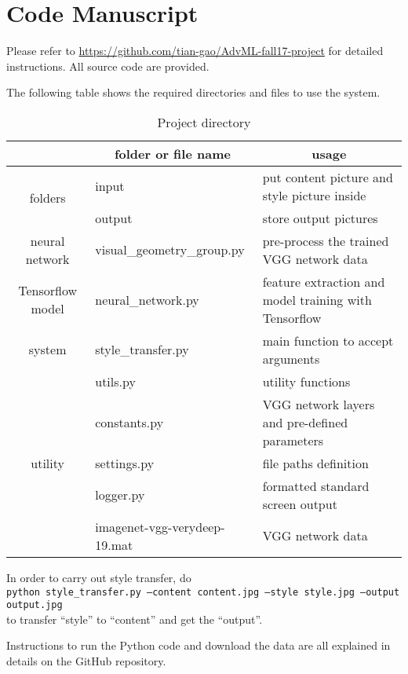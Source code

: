 \chapter{Code Manuscript}
\label{app:readme}


Please refer to \url{https://github.com/tian-gao/AdvML-fall17-project} for detailed instructions.
All source code are provided.

The following table shows the required directories and files to use the system.

	\begin{table}[!htb]
	\center
	\begin{tabular}{c|l|l}
	\hline
	& \multicolumn{1}{c|}{folder or file name} & \multicolumn{1}{c}{usage} \\ \hline
	\multirow{2}{*}{folders}
		& input & put content picture and style picture inside \\
		& output & store output pictures \\ \hline
	neural network & visual\_geometry\_group.py & pre-process the trained VGG network data \\ \hline
	Tensorflow model & neural\_network.py &
		feature extraction and model training with Tensorflow \\ \hline
	system & style\_transfer.py & main function to accept arguments \\ \hline
	\multirow{5}{*}{utility}
		& utils.py & utility functions \\
		& constants.py & VGG network layers and pre-defined parameters \\
		& settings.py & file paths definition \\
		& logger.py & formatted standard screen output \\ \hline
	data & imagenet-vgg-verydeep-19.mat & VGG network data \\
	\hline
	\end{tabular}
	\caption{Project directory}
	\label{table:layers}
	\end{table}

In order to carry out style transfer, do \\
	\texttt{python style\_transfer.py --content content.jpg --style style.jpg --output output.jpg} \\
to transfer ``style'' to ``content'' and get the ``output''.


Instructions to run the Python code and download the data
are all explained in details on the GitHub repository.
